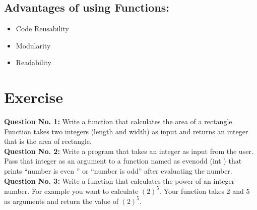 \documentclass{article}
\begin{document}
\subsection{Advantages of using Functions:}

\begin{itemize}
\item Code Reusability
\item Modularity
\item Readability
\end{itemize}

\section{Exercise}
\textbf{Question No. 1:} Write a function that calculates the area of a rectangle. Function takes two integers (length and width) as input and returns an integer that is the area of rectangle.\\
\textbf{Question No. 2:} Write a program that takes an integer as input from the user. Pass that integer as an argument to a function named as evenodd (int ) that prints “number is even ” or “number is odd” after evaluating the number.\\
\textbf{Question No. 3:} Write a function that calculates the power of an integer number. For example you want to calculate $(2)^5$. Your function takes 2 and 5 as arguments and return the value of $(2)^5$.\\
\end{document}
